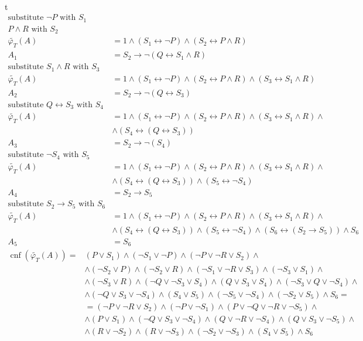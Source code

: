 \documentclass[a4paper,12pt, centered]{article}
\DeclareMathOperator{\cnf}{cnf}
\begin{document}
\begin{enumerate}
\begin{align*}
		\end{align*}t
		\begin{align*}
			\textrm{substitute } \neg P\textrm{ with }S_1&&\\P\land R\textrm{ with }S_2&&\\
			\tilde{\varphi_T}(A)&=1\land(S_1\leftrightarrow\neg P)\land(S_2\leftrightarrow P\land R)&\\A_1&=S_2\to\neg(Q\leftrightarrow S_1\land R)&\\\textrm{substitute } S_1\land R\textrm{ with }S_3&&\\\tilde{\varphi_T}(A)&=1\land(S_1\leftrightarrow\neg P)\land(S_2\leftrightarrow P\land R)\land(S_3\leftrightarrow S_1\land R)&\\A_2&=S_2\to\neg(Q\leftrightarrow S_3)&\\\textrm{substitute } Q\leftrightarrow S_3\textrm{ with }S_4&&\\\tilde{\varphi_T}(A)&=1\land(S_1\leftrightarrow\neg P)\land(S_2\leftrightarrow P\land R)\land(S_3\leftrightarrow S_1\land R)\land&\\&\land(S_4\leftrightarrow(Q\leftrightarrow S_3))&\\A_3&=S_2\to\neg(S_4)&\\\textrm{substitute } \neg S_4\textrm{ with }S_5&&\\\tilde{\varphi_T}(A)&=1\land(S_1\leftrightarrow\neg P)\land(S_2\leftrightarrow P\land R)\land(S_3\leftrightarrow S_1\land R)\land&\\&\land(S_4\leftrightarrow(Q\leftrightarrow S_3))\land(S_5\leftrightarrow \neg S_4) &\\A_4&=S_2\to S_5&\\\textrm{substitute } S_2\to S_5\textrm{ with }S_6\\\tilde{\varphi_T}(A)&=1\land(S_1\leftrightarrow\neg P)\land(S_2\leftrightarrow P\land R)\land(S_3\leftrightarrow S_1\land R)\land&\\&\land(S_4\leftrightarrow(Q\leftrightarrow S_3))\land(S_5\leftrightarrow \neg S_4)\land(S_6\leftrightarrow (S_2\to S_5))\land S_6 &\\ A_5&=S_6&
		\end{align*}
		\begin{align*}
			\cnf(\tilde{\varphi_T}(A))=& (P \lor S_1) \land (\neg S_1 \lor \neg P) \land (\neg P \lor \neg R \lor S_2) \land\\&\land (\neg S_2 \lor P) \land (\neg S_2 \lor R) \land (\neg S_1 \lor \neg R \lor S_3) \land (\neg S_3 \lor S_1) \land\\&\land (\neg S_3 \lor R) \land (\neg Q \lor \neg S_3 \lor S_4) \land (Q \lor S_3 \lor S_4) \land (\neg S_3 \lor Q \lor \neg S_4) \land\\&\land (\neg Q \lor S_3 \lor \neg S_4) \land (S_4 \lor S_5) \land (\neg S_5 \lor \neg S_4) \land (\neg S_2 \lor S_5) \land S_6=\\&=(\neg P\lor\neg R\lor S_2)\land(\neg P\lor \neg S_1)\land(P\lor\neg Q\lor\neg R\lor\neg S_5)\land\\&\land (P\lor S_1)\land(\neg Q\lor S_3\lor\neg S_4)\land (Q\lor\neg R\lor\neg S_4)\land(Q\lor S_3\lor\neg S_5)\land\\&\land(R\lor\neg S_2)\land(R\lor\neg S_3)\land(\neg S_2\lor\neg S_3)\land(S_4\lor S_5)\land S_6  

\end{align*}
\end{enumerate}
\end{document}
